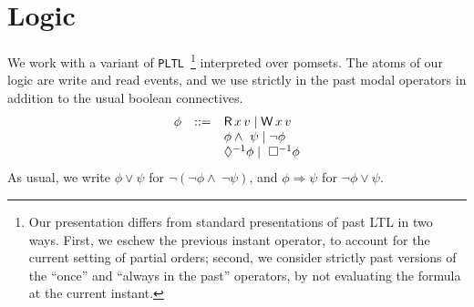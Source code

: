 \section{Logic}
\label{sec:logic}

\newcommand{\since}[2]{{#1} \  {\tt  S } \  {#2}}
\newcommand{\pLTL}{{\tt PLTL}}
\newcommand{\once}{\Diamond^{-1}}
\newcommand{\pastalways}{\Box^{-1}}
\newcommand{\afo}{\phi}
\newcommand{\bfo}{\psi}
\newcommand{\mods}{\tt Models}



We work with a variant of \pLTL\ \footnote{ Our presentation differs from
  standard presentations of past
  LTL\citet{Lichtenstein:1985:GP:648065.747612} in two ways.  First, we
  eschew the previous instant operator, to account for the current setting of
  partial orders; second, we consider strictly past versions of the ``once''
  and ``always in the past'' operators, by not evaluating the formula at the
  current instant.}  interpreted over pomsets.  The atoms of our logic are
write and read events, and we use strictly in the past modal operators in
addition to the usual boolean connectives.
\begin{displaymath}
  \begin{array}{lrl}
    \afo &::=&\DR{\aLoc}{\aVal}  \mid \DW\aLoc\aVal \\
    &&  \afo \wedge\ \bfo \mid \neg \afo  \\
    && \once\afo \mid\ \pastalways\afo
  \end{array} 
\end{displaymath}
As usual, we write $\afo\vee\bfo$ for $\neg(\neg \afo \wedge\ \neg \bfo)$,
and $\afo \Rightarrow \bfo$ for $\neg \afo \vee \bfo$.

